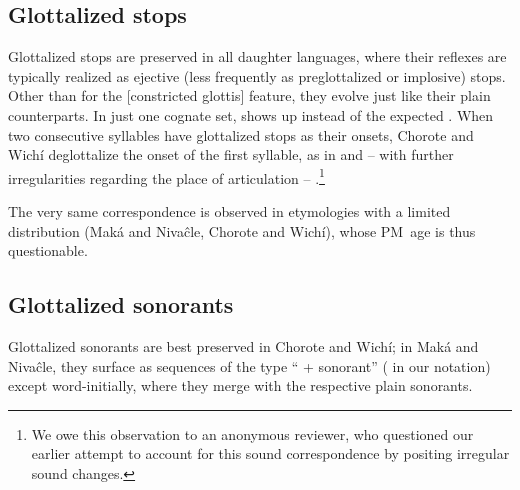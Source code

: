 \subsection{Glottalized stops}\label{glott-obstr}
Glottalized stops are preserved in all daughter languages, where their reflexes are typically realized as ejective (less frequently as preglottalized or implosive) stops. Other than for the [constricted glottis] feature, they evolve just like their plain counterparts. In just one cognate set,  shows up instead of the expected  . When two consecutive syllables have glottalized stops as their onsets, Chorote and Wichí deglottalize the onset of the first syllable, as in  and – with further irregularities regarding the place of articulation – .\footnote{We owe this observation to an anonymous reviewer, who questioned our earlier attempt to account for this sound correspondence by positing irregular sound changes.}

\begin{exe}
    \ex \vulture
    \ex \monkparakeet \label{gl-monkparakeet}
    \ex \armadillo
    \ex \arrowkaxe \label{gl-arrowkaxe}
    \ex \spouse
    \ex \stretchout
    \ex \dividev
    \ex \youngerbro
    \ex \youngersis
    \ex \bottomn
    \ex \hornclub
    \ex \coldn
    \ex \thorncutjan
    \ex \oldn
    \ex \newadj
    \ex \cover
    \ex \lid
    \ex \parakeet
    \ex \soul
    \ex \utensil
    \ex \tears
    \ex \movev
    \ex \rheum
    \ex \woodpecker
    \ex \aunt
    \ex \hardv
    \ex \hornero \label{gl-hornero}
    \ex \guayacan
    \ex \egg
    \ex \widower
\end{exe}

The very same correspondence is observed in etymologies with a limited distribution (Maká and Nivaĉle, Chorote and Wichí), whose PM~age is thus questionable.

\begin{exe}
    \ex \cheek
    \ex \obey
    \ex \spitmn
    \ex \earcw
    \ex \pacu
    \ex \heel
    \ex \tongue
    \ex \soundv
    \ex \saymn
    \ex \cardinal
    \ex \aloja
    \ex \yawn
    \ex \hiccup
\end{exe}

\subsection{Glottalized sonorants}\label{glott-son}
Glottalized sonorants are best preserved in Chorote and Wichí; in Maká and Nivaĉle, they surface as sequences of the type `` + sonorant'' ( in our notation) except word-initially, where they merge with the respective plain sonorants.

